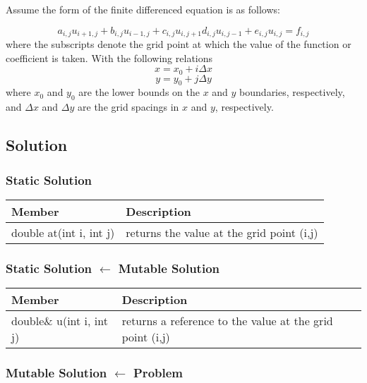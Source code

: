 \documentclass{article}
\begin{document}
Assume the form of the finite differenced equation is as follows:

\begin{equation}
a_{i,j} u_{i+1, j} + b_{i,j} u_{i-1, j} + c_{i,j} u_{i, j+1} d_{i,j} u_{i, j-1} + e_{i,j} u_{i, j} = 
f_{i,j}
\end{equation}
where the subscripts denote the grid point at which the value of the function or coefficient is taken.
With the following relations
\begin{equation}
x = x_{0} + i \Delta x
\end{equation}
\begin{equation}
y = y_{0} + j \Delta y
\end{equation}
where $x_0$ and $y_0$ are the lower bounds on the $x$ and $y$ boundaries, respectively, and $\Delta x$ and
$\Delta y$ are the grid spacings in $x$ and $y$, respectively.
\subsection{Solution}
\subsubsection{Static Solution}

\begin{tabular}[!htb]{|l|l|}
\hline
Member&	Description\\
\hline
double at(int i, int j)&	returns the value at the grid point (i,j)\\
\hline
\end{tabular}

\subsubsection{Static Solution $\leftarrow$ Mutable Solution}

\begin{tabular}[!htb]{|l|l|}
\hline
Member&	Description\\
\hline
double\& u(int i, int j)&	returns a reference to the value at the grid point (i,j)\\
\hline
\end{tabular}

\subsubsection{Mutable Solution $\leftarrow$ Problem}
\end{document}

